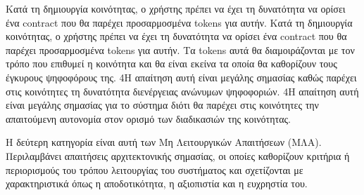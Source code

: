 \begin{enumerate}[label=\textbf{<ΛΑ-\arabic*>}, leftmargin=\parindent, align=left, labelwidth=\parindent, labelsep=0pt]
	\sysReqItem
		{\label{srs:functional-srs-assign-community-contract}}
		{Κατά τη δημιουργία κοινότητας, ο χρήστης πρέπει να έχει τη δυνατότητα να ορίσει ένα contract που θα παρέχει προσαρμοσμένα tokens για αυτήν.}
		{Κατά τη δημιουργία κοινότητας, ο χρήστης πρέπει να έχει τη δυνατότητα να ορίσει ένα contract που θα παρέχει προσαρμοσμένα tokens για αυτήν. Τα tokens αυτά θα διαμοιράζονται με τον τρόπο που επιθυμεί η κοινότητα και θα είναι εκείνα τα οποία θα καθορίζουν τους έγκυρους ψηφοφόρους της.}
		{4}{Η απαίτηση αυτή είναι μεγάλης σημασίας καθώς παρέχει στις κοινότητες τη δυνατότητα διενέργειας ανώνυμων ψηφοφοριών.}
		{4}{Η απαίτηση αυτή είναι μεγάλης σημασίας για το σύστημα διότι θα παρέχει στις κοινότητες την απαιτούμενη αυτονομία στον ορισμό των διαδικασιών της κοινότητας.}
\end{enumerate}

Η δεύτερη κατηγορία είναι αυτή των Μη Λειτουργικών Απαιτήσεων (ΜΛΑ). Περιλαμβάνει απαιτήσεις αρχιτεκτονικής σημασίας, οι οποίες καθορίζουν κριτήρια ή περιορισμούς του τρόπου λειτουργίας του συστήματος και σχετίζονται με χαρακτηριστικά όπως η αποδοτικότητα, η αξιοπιστία και η ευχρηστία του.


